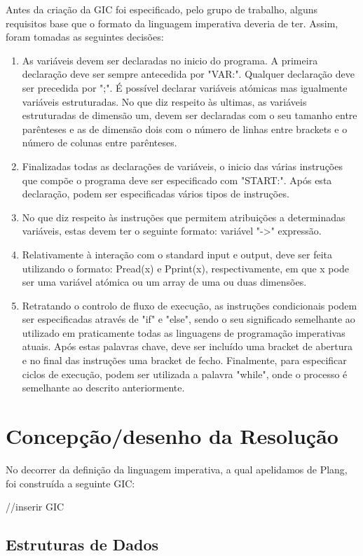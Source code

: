 \documentclass{report}
\begin{document}
Antes da criação da GIC foi especificado, pelo grupo de trabalho, alguns requisitos base que o formato da linguagem imperativa deveria de ter. Assim, foram tomadas as seguintes decisões: 
\begin{enumerate}
\item As variáveis devem ser declaradas no inicio do programa. A primeira declaração deve ser sempre antecedida por "VAR:". Qualquer declaração deve ser precedida por ";". É possível declarar variáveis atómicas mas igualmente variáveis estruturadas. No que diz respeito às ultimas, as variáveis estruturadas de dimensão um, devem ser declaradas com o seu tamanho entre parênteses e as de dimensão dois com o número de linhas entre brackets e o número de colunas entre parênteses.
\item Finalizadas todas as declarações de variáveis, o inicio das várias instruções que compõe o programa deve ser especificado com "START:". Após esta declaração, podem ser especificadas vários  tipos de instruções. 
\item No que diz respeito às instruções que permitem atribuições a determinadas variáveis, estas devem ter o seguinte formato: variável "->" expressão.  
\item Relativamente à interação com o standard input e output, deve ser feita utilizando o formato: Pread(x) e Pprint(x), respectivamente, em que x pode ser uma variável atómica ou um array de uma ou duas dimensões. 
\item Retratando o controlo de fluxo de execução, as instruções condicionais podem ser especificadas através de "if" e "else", sendo o seu significado semelhante ao utilizado em praticamente todas as linguagens de programação imperativas atuais. Após estas palavras chave, deve ser incluído uma bracket de abertura e no final das instruções uma bracket de fecho. Finalmente, para especificar ciclos de execução, podem ser utilizada a palavra "while", onde o processo é semelhante ao descrito anteriormente.  
\end{enumerate}

\chapter{Concepção/desenho da Resolução} \label{cd}

No decorrer da definição da linguagem imperativa, a qual apelidamos de Plang, foi construída a seguinte GIC: 

//inserir GIC

\section{Estruturas de Dados}
\end{document}
